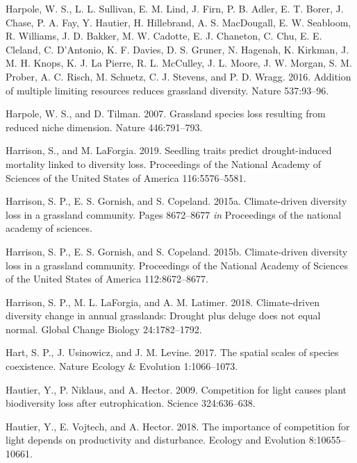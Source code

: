 \documentclass[twoside,12pt,final]{ucthesis-CA2012}
\newlength{\cslhangindent}
\newenvironment{cslreferences}%
  {\setlength{\parindent}{0pt}%
  \everypar{\setlength{\hangindent}{\cslhangindent}}\ignorespaces}%
  {\par}
\begin{document}
\begin{ucmainmatter}
\begin{cslreferences}
\leavevmode\hypertarget{ref-Harpole2016}{}%
Harpole, W. S., L. L. Sullivan, E. M. Lind, J. Firn, P. B. Adler, E. T. Borer, J. Chase, P. A. Fay, Y. Hautier, H. Hillebrand, A. S. MacDougall, E. W. Seabloom, R. Williams, J. D. Bakker, M. W. Cadotte, E. J. Chaneton, C. Chu, E. E. Cleland, C. D'Antonio, K. F. Davies, D. S. Gruner, N. Hagenah, K. Kirkman, J. M. H. Knops, K. J. La Pierre, R. L. McCulley, J. L. Moore, J. W. Morgan, S. M. Prober, A. C. Risch, M. Schuetz, C. J. Stevens, and P. D. Wragg. 2016. Addition of multiple limiting resources reduces grassland diversity. Nature 537:93--96.

\leavevmode\hypertarget{ref-Harpole2007}{}%
Harpole, W. S., and D. Tilman. 2007. Grassland species loss resulting from reduced niche dimension. Nature 446:791--793.

\leavevmode\hypertarget{ref-harrison2019}{}%
Harrison, S., and M. LaForgia. 2019. Seedling traits predict drought-induced mortality linked to diversity loss. Proceedings of the National Academy of Sciences of the United States of America 116:5576--5581.

\leavevmode\hypertarget{ref-harrison2015}{}%
Harrison, S. P., E. S. Gornish, and S. Copeland. 2015a. Climate-driven diversity loss in a grassland community. Pages 8672--8677 \emph{in} Proceedings of the national academy of sciences.

\leavevmode\hypertarget{ref-Harrison2015}{}%
Harrison, S. P., E. S. Gornish, and S. Copeland. 2015b. Climate-driven diversity loss in a grassland community. Proceedings of the National Academy of Sciences of the United States of America 112:8672--8677.

\leavevmode\hypertarget{ref-Harrison2018}{}%
Harrison, S. P., M. L. LaForgia, and A. M. Latimer. 2018. Climate-driven diversity change in annual grasslands: Drought plus deluge does not equal normal. Global Change Biology 24:1782--1792.

\leavevmode\hypertarget{ref-hart2017}{}%
Hart, S. P., J. Usinowicz, and J. M. Levine. 2017. The spatial scales of species coexistence. Nature Ecology \& Evolution 1:1066--1073.

\leavevmode\hypertarget{ref-Hautier2009}{}%
Hautier, Y., P. Niklaus, and A. Hector. 2009. Competition for light causes plant biodiversity loss after eutrophication. Science 324:636--638.

\leavevmode\hypertarget{ref-Hautier2018}{}%
Hautier, Y., E. Vojtech, and A. Hector. 2018. The importance of competition for light depends on productivity and disturbance. Ecology and Evolution 8:10655--10661.


\end{cslreferences}
\end{ucmainmatter}
\end{document}
